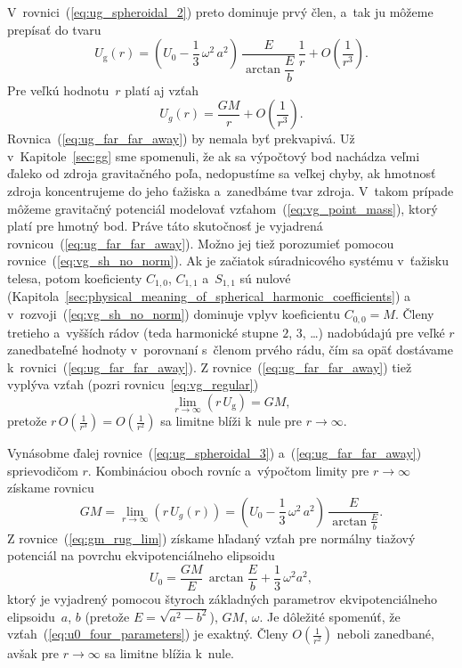 \documentclass[a4paper, 12pt]{book}
\newcommand{\gidx}{\mathrm g}
\begin{document}
V~rovnici~(\ref{eq:ug_spheroidal_2}) preto dominuje prvý člen, a~tak ju môžeme 
prepísať do tvaru
%
\begin{equation}
\label{eq:ug_spheroidal_3}
U_\gidx(r) = \left( U_0 - \frac{1}{3} \, \omega^2 \, a^2 \right) \, 
\frac{E}{\arctan\dfrac{E}{b}} \, \frac{1}{r} + O\left( \frac{1}{r^3} \right){.}
\end{equation}
%
Pre veľkú hodnotu~$r$ platí aj vzťah
%
\begin{equation}
\label{eq:ug_far_far_away}
U_g(r) = \frac{GM}{r} + O\left( \frac{1}{r^3}\right){.}
\end{equation}
%
Rovnica~(\ref{eq:ug_far_far_away}) by nemala byť prekvapivá.  Už 
v~Kapitole~\ref{sec:gg} sme spomenuli, že ak sa výpočtový bod nachádza veľmi 
ďaleko od zdroja gravitačného poľa, nedopustíme sa veľkej chyby, ak hmotnosť 
zdroja koncentrujeme do jeho ťažiska a~zanedbáme tvar zdroja.  V~takom prípade 
môžeme gravitačný potenciál modelovať vzťahom~(\ref{eq:vg_point_mass}), ktorý 
platí pre hmotný bod.  Práve táto skutočnosť je vyjadrená 
rovnicou~(\ref{eq:ug_far_far_away}).  Možno jej tiež porozumieť pomocou 
rovnice~(\ref{eq:vg_sh_no_norm}).  Ak je začiatok súradnicového systému 
v~ťažisku telesa, potom koeficienty $C_{1,0}$, $C_{1,1}$ a~$S_{1,1}$ sú nulové 
(Kapitola~\ref{sec:physical_meaning_of_spherical_harmonic_coefficients}) 
a v~rozvoji~(\ref{eq:vg_sh_no_norm}) dominuje vplyv koeficientu $C_{0,0} = M$.  
Členy tretieho a~vyšších rádov (teda harmonické stupne $2$, $3$, \dots) 
nadobúdajú pre veľké $r$ zanedbateľné hodnoty v~porovnaní s~členom prvého rádu, 
čím sa opäť dostávame k~rovnici~(\ref{eq:ug_far_far_away}).  
Z rovnice~(\ref{eq:ug_far_far_away}) tiež vyplýva vzťah (pozri 
rovnicu~\ref{eq:vg_regular})
%
\begin{equation}
\lim_{r \rightarrow \infty} (r \, U_\gidx) = GM{,}
\end{equation}
%
pretože $r \, O \left( \frac{1}{r^3} \right) = O\left( \frac{1}{r^2} \right)$ 
sa limitne blíži k~nule pre $r \rightarrow \infty$.

Vynásobme ďalej rovnice~(\ref{eq:ug_spheroidal_3}) a~(\ref{eq:ug_far_far_away}) 
sprievodičom $r$.  Kombináciou oboch rovníc a~výpočtom limity pre $r 
\rightarrow \infty$ získame rovnicu
%
\begin{equation}
\label{eq:gm_rug_lim}
GM = \lim_{r \rightarrow \infty} (r \, U_g(r)) = \left( U_0 - \frac{1}{3} \, 
\omega^2 \, a^2 \right) \, \frac{E}{\arctan\frac{E}{b}}{.}
\end{equation}
%
Z rovnice~(\ref{eq:gm_rug_lim}) získame hľadaný vzťah pre normálny tiažový 
potenciál na povrchu ekvipotenciálneho elipsoidu
%
\begin{equation}
\label{eq:u0_four_parameters}
U_0 = \frac{GM}{E} \, \arctan\frac{E}{b} + \frac{1}{3} \, \omega^2 a^2{,}
\end{equation}
%
ktorý je vyjadrený pomocou štyroch základných parametrov ekvipotenciálneho 
elipsoidu~$a$, $b$ (pretože $E = \sqrt{a^2 - b^2}$), $GM$, $\omega$.  Je 
dôležité spomenúť, že vzťah~(\ref{eq:u0_four_parameters}) je exaktný.  Členy 
$O\left( \frac{1}{r^2} \right)$ neboli zanedbané, avšak pre $r \rightarrow 
\infty$ sa limitne blížia k~nule.
\end{document}
